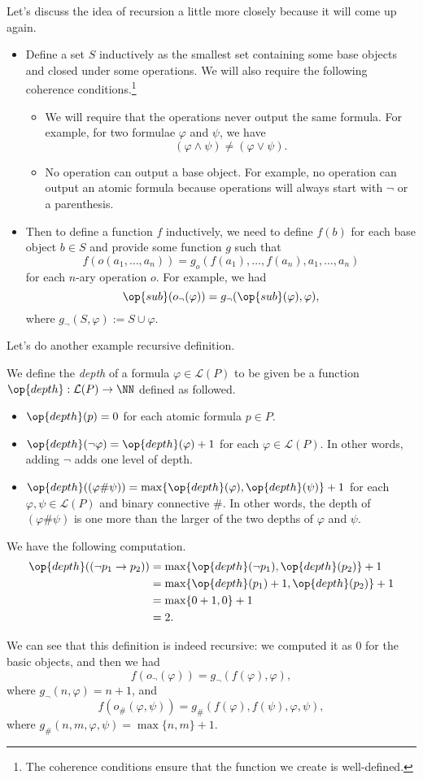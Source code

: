 \documentclass[../notes.tex]{subfiles}
\begin{document}
Let's discuss the idea of recursion a little more closely because it will come up again.
\begin{itemize}
	\item Define a set $S$ inductively as the smallest set containing some base objects and closed under some operations. We will also require the following coherence conditions.\footnote{The coherence conditions ensure that the function we create is well-defined.}
	\begin{itemize}
		\item We will require that the operations never output the same formula. For example, for two formulae $\varphi$ and $\psi$, we have
		\[(\varphi\land\psi)\ne(\varphi\lor\psi).\]
		\item No operation can output a base object. For example, no operation can output an atomic formula because operations will always start with $\lnot$ or a parenthesis.
	\end{itemize}
	\item Then to define a function $f$ inductively, we need to define $f(b)$ for each base object $b\in S$ and provide some function $g$ such that
	\[f(o(a_1,\ldots,a_n))=g_o(f(a_1),\ldots,f(a_n),a_1,\ldots,a_n)\]
	for each $n$-ary operation $o$. For example, we had
	\[\op{sub}(o_\lnot(\varphi))=g_\lnot(\op{sub}(\varphi),\varphi),\]
	where $g_\lnot(S,\varphi):=S\cup\varphi$.
\end{itemize}
Let's do another example recursive definition.
\begin{definition}[Depth]
	We define the \textit{depth} of a formula $\varphi\in\mathcal L(P)$ to be given be a function $\op{depth}:\mathcal L(P)\to\NN$ defined as followed.
	\begin{itemize}
		\item $\op{depth}(p)=0$ for each atomic formula $p\in P$.
		\item $\op{depth}(\lnot\varphi)=\op{depth}(\varphi)+1$ for each $\varphi\in\mathcal L(P)$. In other words, adding $\lnot$ adds one level of depth.
		\item $\op{depth}((\varphi\#\psi))=\max\{\op{depth}(\varphi),\op{depth}(\psi)\}+1$ for each $\varphi,\psi\in\mathcal L(P)$ and binary connective $\#$. In other words, the depth of $(\varphi\#\psi)$ is one more than the larger of the two depths of $\varphi$ and $\psi$.
	\end{itemize}
\end{definition}
\begin{example}
	We have the following computation.
	\begin{align*}
		\op{depth}((\lnot p_1\to p_2)) &= \max\{\op{depth}(\lnot p_1),\op{depth}(p_2)\}+1 \\
		&= \max\{\op{depth}(p_1)+1,\op{depth}(p_2)\}+1 \\
		&= \max\{0+1,0\}+1 \\
		&= 2.
	\end{align*}
\end{example}
We can see that this definition is indeed recursive: we computed it as $0$ for the basic objects, and then we had
\[f(o_\lnot(\varphi))=g_\lnot(f(\varphi),\varphi),\]
where $g_\lnot(n,\varphi)=n+1$, and
\[f(o_\#(\varphi,\psi))=g_\#(f(\varphi),f(\psi),\varphi,\psi),\]
where $g_\#(n,m,\varphi,\psi)=\max\{n,m\}+1$.
\end{document}
